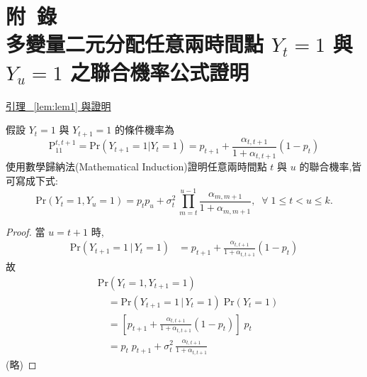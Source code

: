 %
%

\chapter*{附~錄\\多變量二元分配任意兩時間點 $Y_t = 1$ 與 $Y_u = 1$ 之聯合機率公式證明}\label{ch:appendix_cov}

\underline{引理~ \ref{lem:lem1} 與證明}

\noindent 假設 $Y_t=1$ 與 $Y_{t+1}=1$ 的條件機率為
\begin{equation*}
  \mbox{P}^{t,t+1}_{11}=\mbox{Pr}(Y_{t+1}=1|Y_t=1)=p_{t+1}+\frac{\alpha_{t,t+1}}{1+\alpha_{t,t+1}} (1-p_t)
\end{equation*}
使用數學歸納法(Mathematical Induction)證明任意兩時間點 $t$ 與 $u$ 的聯合機率,皆可寫成下式:
\begin{equation*}
  \mbox{Pr}(Y_t=1, Y_u=1)=p_t p_u + \sigma_t^2 \, \prod_{m=t}^{u-1} \frac{\alpha_{m,m+1}}{1+\alpha_{m,m+1}},\;\;\forall\; 1\leq t<u \leq k.
\end{equation*}

\begin{proof}
當 $u=t+1$ 時,
       \begin{align*}
        \mbox{Pr}(Y_{t+1}=1\,|\,Y_t=1) &= p_{t+1}+\frac{\alpha_{t,t+1}}{1+\alpha_{t,t+1}}(1-p_t)
     \end{align*}
   故 \begin{align*}
        &\mbox{Pr}(Y_t=1, Y_{t+1}=1) \\
            &\quad= \mbox{Pr}(Y_{t+1}=1\,|\,Y_t=1) \; \mbox{Pr}(Y_t=1) \\
            &\quad= \left[p_{t+1}+\frac{\alpha_{t,t+1}}{1+\alpha_{t,t+1}}(1-p_t)\right] \; p_t \\
            &\quad= p_t \; p_{t+1} +\sigma_t^2 \, \frac{\alpha_{t,t+1}}{1+\alpha_{t,t+1}}
     \end{align*}
(略)    
\end{proof}

%


